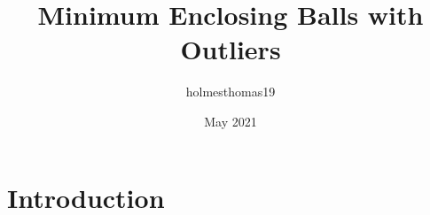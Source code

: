 \documentclass{article}
\title{Minimum Enclosing Balls with Outliers}
\author{holmesthomas19 }
\date{May 2021}
\begin{document}
\maketitle

\section{Introduction}
\end{document}
